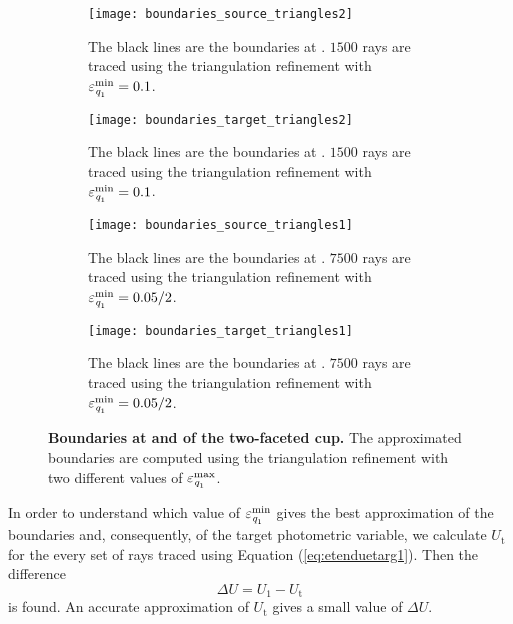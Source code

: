 \begin{figure}[h!]
\centering
\begin{subfigure}{.45\textwidth}
  \texttt{[image: boundaries\_source\_triangles2]}
 \caption{The black lines are the boundaries at . $1500$ rays are traced using the triangulation refinement with $\varepsilon_{\textit{q}_1}^{\textrm{min}}=0.1$. }
  \label{fig:boundary_s2}
\end{subfigure}%
\begin{subfigure}{.45\textwidth}
  \texttt{[image: boundaries\_target\_triangles2]}
  \caption{The black lines are the boundaries at . $1500$ rays are traced using the triangulation refinement with $\varepsilon_{\textit{q}_1}^{\textrm{min}}=0.1$.} %
  \label{fig:boundaries_t2}
\end{subfigure} %
\begin{subfigure}{.45\textwidth}
  \texttt{[image: boundaries\_source\_triangles1]}
  \caption{The black lines are the boundaries at . $7500$ rays are traced using the triangulation refinement with $\varepsilon_{\textit{q}_1}^{\textrm{min}}=0.05/2$.}
  \label{fig:boundaries_s1}
\end{subfigure}%
\begin{subfigure}{.45\textwidth}
  \texttt{[image: boundaries\_target\_triangles1]}
 \caption{The black lines are the boundaries at . $7500$ rays are traced using the triangulation refinement with $\varepsilon_{\textit{q}_1}^{\textrm{min}}=0.05/2$.} %
  \label{fig:boundaries_t1}
\end{subfigure}
\caption{\textbf{Boundaries at  and  of the two-faceted cup.} The approximated boundaries are computed using the triangulation refinement with two different values of $\varepsilon_{\textit{q}_1}^{\textrm{max}}$.}
\label{fig:boundaries_cup}
\end{figure} 
In order to understand which value of  $\varepsilon_{\textit{q}_1}^{\textrm{min}}$ gives the best approximation of the boundaries and, consequently, of the target photometric variable, we calculate $U_{\textrm{t}}$ for the every set of rays traced using Equation (\ref{eq:etenduetarg1}). Then the difference 
\begin{equation}\label{eq:delta} \Delta U = U_1-U_{\textrm{t}} 
\end{equation} is found.
An accurate approximation of $U_{\textrm{t}}$ gives a small value of $\Delta U$. 
